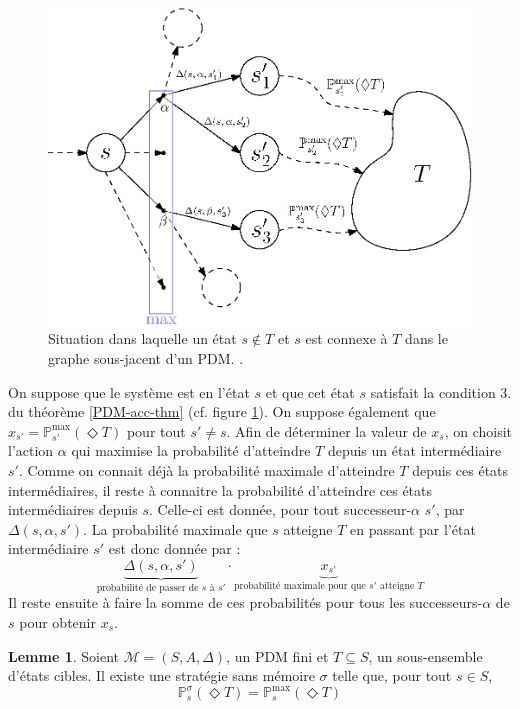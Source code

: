 \documentclass[12pt,a4paper]{report}
\theoremstyle{definition}%
\newtheorem{lemma}{Lemme}[chapter]
\theoremstyle{remark}
\newcommand{\pr}{\mathbb{P}}
\begin{document}
\begin{figure}[H]
	\centering
	\captionsetup{justification=centering}
	\includegraphics[scale=0.7]{figures/accessibilite-PDM-schema}
	\caption{Situation dans laquelle un état $s \not \in T$ et $s$ est connexe à
	$T$ dans le graphe sous-jacent d'un PDM.
	.}
	\label{PDM-acc-figure}
\end{figure}
	On suppose que le système est en l'état $s$ et que cet état $s$ satisfait la
	condition $3.$ du théorème \ref{PDM-acc-thm} (cf. figure
	\ref{PDM-acc-figure}). On suppose également que $x_{s'} =
	\pr_{s'}^{\max}(\Diamond T)$ pour tout $s' \neq s$. Afin de déterminer
	la valeur de $x_s$, on choisit l'action $\alpha$ qui maximise la probabilité
	d'atteindre $T$ depuis un état intermédiaire $s'$. Comme on connait déjà
	la probabilité maximale d'atteindre $T$ depuis ces états intermédiaires, il reste à
	connaitre la probabilité d'atteindre ces états intermédiaires depuis $s$.
	Celle-ci est donnée, pour tout successeur-$\alpha$ $s'$,
	par $\Delta(s, \alpha, s')$. La probabilité maximale que $s$ atteigne $T$
	en passant par l'état intermédiaire $s'$ est donc donnée par :
	\[\underbrace{\Delta(s, \alpha, s')}_{\text{probabilité de passer de $s$ à $s'$}} \cdot \underbrace{x_{s'}}_{\text{probabilité maximale pour que $s'$ atteigne $T$}}\]
	Il reste ensuite à faire la somme
	de ces probabilités pour tous les successeurs-$\alpha$ de $s$ pour obtenir
	$x_s$.

\begin{lemma}\label{strat-proof}
		Soient $\mathcal{M} = (S, A, \Delta)$, un PDM fini et $T \subseteq S$, un
		sous-ensemble d'états cibles. Il existe une stratégie sans mémoire
		$\sigma$ telle que, pour tout $s \in S$,
		\[
			\pr^\sigma_s(\Diamond T) = \pr^{\max}_s(\Diamond T)
		\]
\end{lemma}
\end{document}
